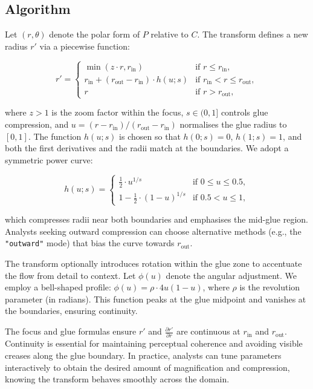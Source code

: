 \subsection{Algorithm}\label{algorithm}

Let \((r, \theta)\) denote the polar form of \(P\) relative to \(C\). The transform defines a new
radius \(r'\) via a piecewise function:

\[
 r' = 
 \begin{cases}
   \min\left( z \cdot r, r_{\text{in}} \right) & \text{if } r \le r_{\text{in}}, \\
   r_{\text{in}} + (r_{\text{out}} - r_{\text{in}}) \cdot h(u; s) & \text{if } r_{\text{in}} < r \le r_{\text{out}}, \\
   r & \text{if } r > r_{\text{out}},
 \end{cases}
\]

where \(z > 1\) is the zoom factor within the focus, \(s \in (0, 1]\) controls glue compression, and
\(u = { (r - r_{\text{in}}) }/{ (r_{\text{out}} - r_{\text{in}}) }\) normalises the glue radius to
\([0,1]\). The function \(h(u; s)\) is chosen so that \(h(0; s) = 0\), \(h(1; s) = 1\), and both the
first derivatives and the radii match at the boundaries. We adopt a symmetric power curve:

\[
 h(u; s) = 
 \begin{cases}
   \tfrac{1}{2} \cdot u^{1/s} & \text{if } 0 \le u \le 0.5, \\
   1 - \tfrac{1}{2} \cdot (1 - u)^{1/s} & \text{if } 0.5 < u \le 1,
 \end{cases}
\]

which compresses radii near both boundaries and emphasises the mid-glue region. Analysts seeking
outward compression can choose alternative methods (e.g., the \texttt{"outward"} mode) that bias the curve
towards \(r_{\text{out}}\).

The transform optionally introduces rotation within the glue zone to accentuate the flow from detail
to context. Let \(\phi(u)\) denote the angular adjustment. We employ a bell-shaped profile:
\(\phi(u) = \rho \cdot 4u(1-u)\), where \(\rho\) is the revolution parameter (in radians). This
function peaks at the glue midpoint and vanishes at the boundaries, ensuring continuity.

The focus and glue formulas ensure \(r'\) and \(\frac{\partial r'}{\partial r}\) are continuous at
\(r_{\text{in}}\) and \(r_{\text{out}}\). Continuity is essential for maintaining perceptual
coherence and avoiding visible creases along the glue boundary. In practice, analysts can tune
parameters interactively to obtain the desired amount of magnification and compression, knowing the
transform behaves smoothly across the domain.

